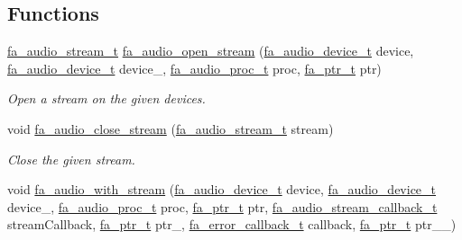 \subsection*{Functions}
\begin{DoxyCompactItemize}
\item 
\hyperlink{group___fa_audio_stream_ga78fbee3026130ce00d8e00a4e73a84c3}{fa\-\_\-audio\-\_\-stream\-\_\-t} \hyperlink{group___fa_audio_stream_ga912f03969d6207dd40a2746e62888adb}{fa\-\_\-audio\-\_\-open\-\_\-stream} (\hyperlink{group___fa_audio_device_ga03de89ee66c6465f8cedd3a0286598f4}{fa\-\_\-audio\-\_\-device\-\_\-t} device, \hyperlink{group___fa_audio_device_ga03de89ee66c6465f8cedd3a0286598f4}{fa\-\_\-audio\-\_\-device\-\_\-t} device\-\_\-, \hyperlink{group___fa_audio_device_gae190189bb20427f20453f2e4d48ecc7b}{fa\-\_\-audio\-\_\-proc\-\_\-t} proc, \hyperlink{group___fa_ga915ddeae99ad7568b273d2b876425197}{fa\-\_\-ptr\-\_\-t} ptr)
\begin{DoxyCompactList}\small\item\em Open a stream on the given devices. \end{DoxyCompactList}\item 
void \hyperlink{group___fa_audio_stream_ga79df3c5ef2dd7844fe00aa24f0a53d2e}{fa\-\_\-audio\-\_\-close\-\_\-stream} (\hyperlink{group___fa_audio_stream_ga78fbee3026130ce00d8e00a4e73a84c3}{fa\-\_\-audio\-\_\-stream\-\_\-t} stream)
\begin{DoxyCompactList}\small\item\em Close the given stream. \end{DoxyCompactList}\item 
void \hyperlink{group___fa_audio_stream_gaa385a92b31401915477027e03a39094e}{fa\-\_\-audio\-\_\-with\-\_\-stream} (\hyperlink{group___fa_audio_device_ga03de89ee66c6465f8cedd3a0286598f4}{fa\-\_\-audio\-\_\-device\-\_\-t} device, \hyperlink{group___fa_audio_device_ga03de89ee66c6465f8cedd3a0286598f4}{fa\-\_\-audio\-\_\-device\-\_\-t} device\-\_\-, \hyperlink{group___fa_audio_device_gae190189bb20427f20453f2e4d48ecc7b}{fa\-\_\-audio\-\_\-proc\-\_\-t} proc, \hyperlink{group___fa_ga915ddeae99ad7568b273d2b876425197}{fa\-\_\-ptr\-\_\-t} ptr, \hyperlink{group___fa_audio_stream_gab6aa7a7bed246893a5cb6d20d2e53199}{fa\-\_\-audio\-\_\-stream\-\_\-callback\-\_\-t} stream\-Callback, \hyperlink{group___fa_ga915ddeae99ad7568b273d2b876425197}{fa\-\_\-ptr\-\_\-t} ptr\-\_\-, \hyperlink{group___fa_error_ga43d8d45a005130a5052ba3281a8bf33e}{fa\-\_\-error\-\_\-callback\-\_\-t} callback, \hyperlink{group___fa_ga915ddeae99ad7568b273d2b876425197}{fa\-\_\-ptr\-\_\-t} ptr\-\_\-\-\_\-)

\end{DoxyCompactItemize}
